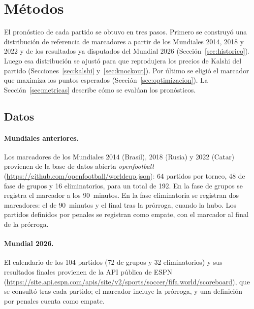 \documentclass[12pt]{article}
\theoremstyle{plain}
\theoremstyle{remark}
\begin{document}
\section{Métodos}
\label{sec:metodos}

El pronóstico de cada partido se obtuvo en tres pasos.
Primero se construyó una distribución de referencia de marcadores a
partir de los Mundiales 2014, 2018 y 2022 y de los resultados ya
disputados del Mundial 2026 (Sección~\ref{sec:historico}).
Luego esa distribución se ajustó para que reprodujera los precios de
Kalshi del partido (Secciones~\ref{sec:kalshi} y~\ref{sec:knockout}).
Por último se eligió el marcador que maximiza los puntos esperados
(Sección~\ref{sec:optimizacion}).
La Sección~\ref{sec:metricas} describe cómo se evalúan los pronósticos.

\subsection{Datos}
\label{sec:datos}

\paragraph{Mundiales anteriores.}
Los marcadores de los Mundiales 2014 (Brasil), 2018 (Rusia) y 2022
(Catar) provienen de la base de datos abierta \textit{openfootball}
(\url{https://github.com/openfootball/worldcup.json}):
64 partidos por torneo, 48 de fase de grupos y 16 eliminatorios, para
un total de 192.
En la fase de grupos se registra el marcador a los 90~minutos.
En la fase eliminatoria se registran dos marcadores: el de 90~minutos
y el final tras la prórroga, cuando la hubo.
Los partidos definidos por penales se registran como empate, con el
marcador al final de la prórroga.

\paragraph{Mundial 2026.}
El calendario de los 104 partidos (72 de grupos y 32 eliminatorios)
y sus resultados finales provienen de la API pública de ESPN
(\url{https://site.api.espn.com/apis/site/v2/sports/soccer/fifa.world/scoreboard}),
que se consultó tras cada partido; el marcador incluye la prórroga, y
una definición por penales cuenta como empate.
\end{document}
